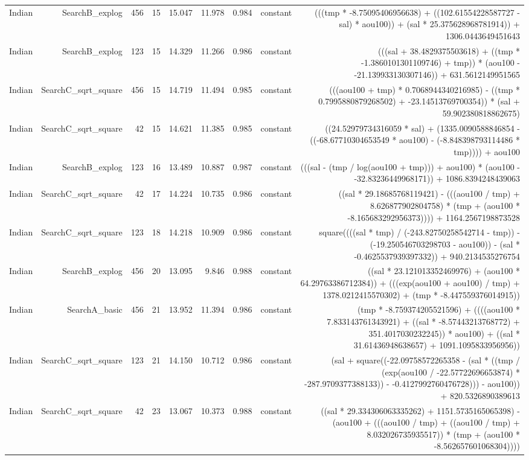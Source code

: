 \begin{table}
{\begin{tabular}{lrrrrrrrr}
Indian & SearchB\_explog & 456 & 15 & 15.047 & 11.978 & 0.984 & constant & (((tmp * -8.75095406956638) + ((102.61554228587727 - sal) * aou100)) + (sal * 25.375628968781914)) + 1306.0443649451643 \\
Indian & SearchB\_explog & 123 & 15 & 14.329 & 11.266 & 0.986 & constant & (((sal + 38.4829375503618) + ((tmp * -1.3860101301109746) + tmp)) * (aou100 - -21.139933130307146)) + 631.5612149951565 \\
Indian & SearchC\_sqrt\_square & 456 & 15 & 14.719 & 11.494 & 0.985 & constant & (((aou100 + tmp) * 0.7068944340216985) - ((tmp * 0.7995880879268502) + -23.14513769700354)) * (sal + 59.902380818862675) \\
Indian & SearchC\_sqrt\_square & 42 & 15 & 14.621 & 11.385 & 0.985 & constant & ((24.52979734316059 * sal) + (1335.0090588846854 - ((-68.67710304653549 * aou100) - (-8.848398793114486 * tmp)))) + aou100 \\
Indian & SearchB\_explog & 123 & 16 & 13.489 & 10.887 & 0.987 & constant & (((sal - (tmp / log(aou100 + tmp))) + aou100) * (aou100 - -32.83236449968171)) + 1086.8394248439063 \\
Indian & SearchC\_sqrt\_square & 42 & 17 & 14.224 & 10.735 & 0.986 & constant & ((sal * 29.18685768119421) - (((aou100 / tmp) + 8.626877902804758) * (tmp + (aou100 * -8.165683292956373)))) + 1164.2567198873528 \\
Indian & SearchC\_sqrt\_square & 123 & 18 & 14.218 & 10.909 & 0.986 & constant & square((((sal * tmp) / (-243.82750258542714 - tmp)) - (-19.250546703298703 - aou100)) - (sal * -0.4625537939397332)) + 940.2134535276754 \\
Indian & SearchB\_explog & 456 & 20 & 13.095 & 9.846 & 0.988 & constant & ((sal * 23.121013352469976) + (aou100 * 64.29763386712384)) + (((exp(aou100 + aou100) / tmp) + 1378.0212415570302) + (tmp * -8.447559376014915)) \\
Indian & SearchA\_basic & 456 & 21 & 13.952 & 11.394 & 0.986 & constant & (tmp * -8.759374205521596) + ((((aou100 * 7.833143761343921) + ((sal * -8.57443213768772) + 351.4017030232245)) * aou100) + ((sal * 31.61436948638657) + 1091.1095833956956)) \\
Indian & SearchC\_sqrt\_square & 123 & 21 & 14.150 & 10.712 & 0.986 & constant & (sal + square((-22.09758572265358 - (sal * ((tmp / (exp(aou100 / -22.57722696653874) * -287.9709377388133)) - -0.4127992760476728))) - aou100)) + 820.5326890389613 \\
Indian & SearchC\_sqrt\_square & 42 & 23 & 13.067 & 10.373 & 0.988 & constant & ((sal * 29.334306063335262) + 1151.5735165065398) - (aou100 + (((aou100 / tmp) + ((aou100 / tmp) + 8.032026735935517)) * (tmp + (aou100 * -8.562657601068304)))) \\

\end{tabular}}
\end{table}
